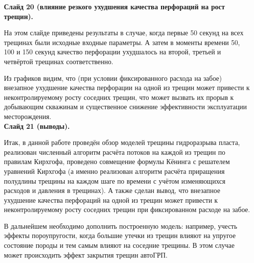 \documentclass[a4paper, 12pt]{article}
\begin{document}
\textbf{Слайд 20 (влияние резкого ухудшения качества перфораций на рост трещин).}

На этом слайде приведены результаты в случае, когда первые 50 секунд на всех трещинах были исходные входные параметры.
А затем в моменты времени 50, 100 и 150 секунд качество перфорации ухудшалось на второй, третьей и четвёртой трещинах соответственно.

Из графиков видим, что (при условии фиксированного расхода на забое) внезапное ухудшение качества перфорации на одной из трещин может привести к неконтролируемому росту соседних трещин, что может вызвать их прорыв к добывающим скважинам и существенное снижение эффективности эксплуатации месторождения.\\

\textbf{Слайд 21 (выводы).}

Итак, в данной работе проведён обзор моделей трещины гидроразрыва пласта, реализован численный алгоритм расчёта потоков на каждой из трещин по правилам Кирхгофа, проведено совмещение формулы Кёнинга с решателем уравнений Кирхгофа (а именно реализован алгоритм расчёта приращения полудлины трещины на каждом шаге по времени с учётом изменяющихся расходов и давления в трещинах).
А также сделан вывод, что внезапное ухудшение качества перфораций на одной из трещин может привести к неконтролируемому росту соседних трещин при фиксированном расходе на забое.

В дальнейшем необходимо дополнить построенную модель: например, учесть эффекты пороупругости, когда большие утечки из трещин влияют на упругое состояние породы и тем самым влияют на соседние трещины.
В этом случае может происходить эффект закрытия трещин автоГРП.
\end{document}
